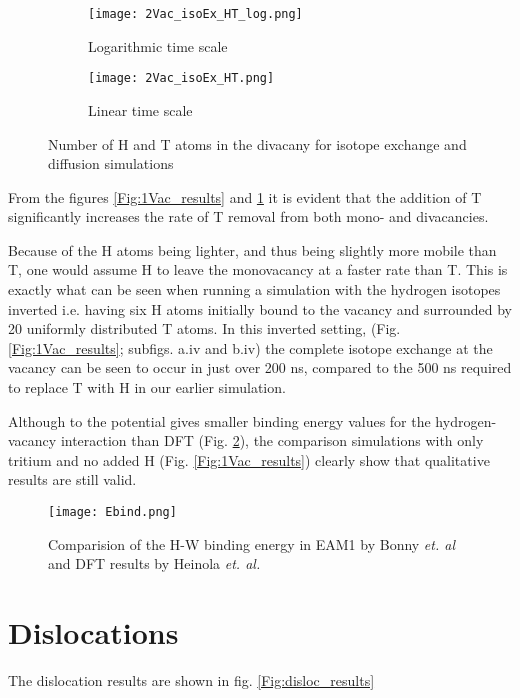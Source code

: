 \begin{figure}[ht]
\begin{subfigure}{.5\textwidth}
  \centering
 \texttt{[image: 2Vac\_isoEx\_HT\_log.png]}  
  \caption{Logarithmic time scale}
\end{subfigure}
\begin{subfigure}{.5\textwidth}
  \centering
  \texttt{[image: 2Vac\_isoEx\_HT.png]}  
  \caption{Linear time scale}
\end{subfigure}
   \caption{Number of H and T atoms in the divacany for isotope exchange and diffusion simulations}
   \label{Fig:2Vac_results} 
\end{figure}

From the figures \ref{Fig:1Vac_results} and \ref{Fig:2Vac_results} it is evident that the addition of T significantly increases the rate of T removal from both mono- and divacancies. 

Because of the H atoms being lighter, and thus being slightly more mobile than T, one would assume H to leave the monovacancy at a faster rate than T. 
This is exactly what can be seen when running a simulation with the hydrogen isotopes inverted i.e. having six H atoms initially bound to the vacancy and surrounded by 20 uniformly distributed T atoms. 
In this inverted setting, (Fig. \ref{Fig:1Vac_results}; subfigs. a.iv and b.iv) the complete isotope exchange at the vacancy can be seen to occur in just over 200 ns, compared to the 500 ns required to replace T with H in our earlier simulation.  

Although to the potential gives smaller binding energy values for the hydrogen-vacancy interaction than DFT (Fig. \ref{Fig:Ebind1H_DFT}), the comparison simulations with only tritium and no added H (Fig. \ref{Fig:1Vac_results}) clearly show that qualitative results are still valid.

\begin{figure}[!ht]
\center
\texttt{[image: Ebind.png]}
\caption{Comparision of the H-W binding energy in EAM1 by Bonny \textit{et. al} and DFT results by Heinola \textit{et. al. }\cite{heinolaTungstenDFT}}
\label{Fig:Ebind1H_DFT}
\end{figure}




\section{Dislocations}
The dislocation results are shown in fig. \ref{Fig:disloc_results}

